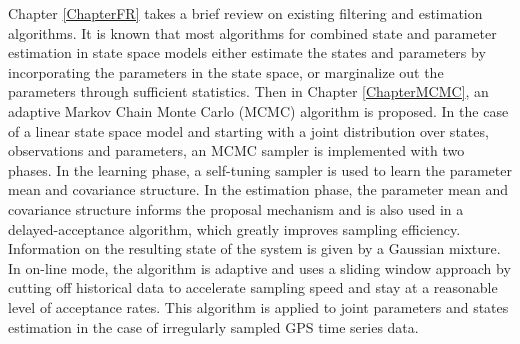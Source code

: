 Chapter \ref{ChapterFR} takes a brief review on existing filtering and estimation algorithms. It is known that most algorithms for combined state and parameter estimation in state space models either estimate the states and parameters by incorporating the parameters in the state space, or marginalize out the parameters through sufficient statistics. Then in Chapter \ref{ChapterMCMC}, an adaptive Markov Chain Monte Carlo (MCMC) algorithm is proposed. In the case of a linear state space model and starting with a joint distribution over states, observations and parameters, an MCMC sampler is implemented with two phases. In the learning phase, a self-tuning sampler is used to learn the parameter mean and covariance structure. In the estimation phase, the parameter mean and covariance structure informs the proposal mechanism and is also used in a delayed-acceptance algorithm, which greatly improves sampling efficiency. Information on the resulting state of the system is given by a Gaussian mixture. In on-line mode, the algorithm is adaptive and uses a sliding window approach by cutting off historical data to accelerate sampling speed and stay at a reasonable level of acceptance rates. This algorithm is applied to joint parameters and states estimation in the case of irregularly sampled GPS time series data. 





